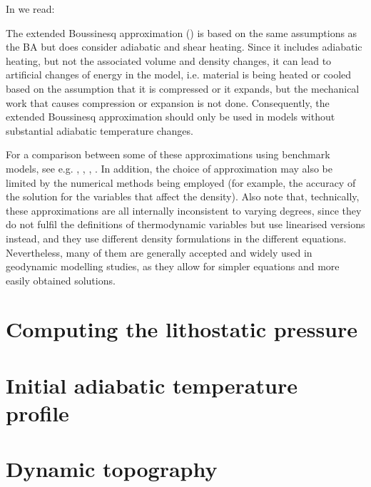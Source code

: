 \documentclass[a4paper,12pt]{article}
\begin{document}
In \textcite{vacp22} we read: 
\begin{displayquote}
The extended Boussinesq approximation (\cite{chyu85,oxtu78}) is based
on the same assumptions as the BA but does consider adiabatic 
and shear heating. Since it includes adiabatic heating,
but not the associated volume and density changes, it can
lead to artificial changes of energy in the model, i.e. material 
is being heated or cooled based on the assumption that
it is compressed or it expands, but the mechanical work that
causes compression or expansion is not done. Consequently,
the extended Boussinesq approximation should only be used
in models without substantial adiabatic temperature changes.

For a comparison between some of these approximations
using benchmark models, see e.g. \textcite{sthe89},
\textcite{lezh08}, \textcite{kilv10}, \textcite{gadb20}. 
In addition, the choice of approximation may
also be limited by the numerical methods being employed
(for example, the accuracy of the solution for the variables
that affect the density). Also note that, technically, these 
approximations are all internally inconsistent to varying 
degrees, since they do not fulfil the definitions of
thermodynamic variables but use linearised versions instead,
and they use different density formulations in the different 
equations. Nevertheless, many of them are generally accepted 
and widely used in geodynamic modelling studies, as
they allow for simpler equations and more easily obtained solutions.
\end{displayquote}


\section{Computing the lithostatic pressure}


\section{Initial adiabatic temperature profile}




\section{Dynamic topography}
\end{document}

